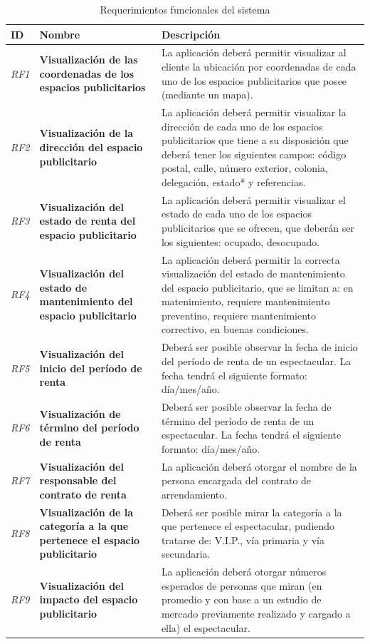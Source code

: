 \documentclass[12pt]{article}
\begin{document}
{\small
\begin{longtable}[H]{m{2cm}m{4cm}m{6cm}}
    \caption{\normalsize{Requerimientos funcionales del sistema}}\\
    
    \toprule
    
    \centering \textbf{ID} & \centering  \textbf{Nombre} & \centering \small \textbf{Descripción} \tabularnewline
    \midrule
    \textit{RF1} & \textbf{Visualización de las coordenadas de los espacios publicitarios} & La aplicación deberá permitir visualizar al cliente la ubicación por coordenadas de cada uno de los espacios publicitarios que posee (mediante un mapa). \tabularnewline
    \textit{RF2} & \textbf{Visualización de la dirección del espacio publicitario} & La aplicación deberá permitir visualizar la dirección de cada uno de los espacios publicitarios que tiene a su disposición que deberá tener los siguientes campos: código postal, calle, número exterior, colonia, delegación, estado* y referencias. \tabularnewline
    \textit{RF3} & \textbf{Visualización del estado de renta del espacio publicitario} & La aplicación deberá permitir visualizar  el estado de cada uno de los espacios publicitarios que se ofrecen, que deberán ser los siguientes: ocupado, desocupado. \tabularnewline
    \textit{RF4} & \textbf{Visualización  del estado de mantenimiento del espacio publicitario} & La aplicación deberá permitir la correcta visualización del estado de mantenimiento del espacio publicitario, que se limitan a: en matenimiento, requiere mantenimiento preventino, requiere mantenimiento correctivo, en buenas condiciones. \tabularnewline
    \textit{RF5} & \textbf{Visualización del inicio del período de renta} & Deberá ser posible observar la fecha de inicio del período de renta de un espectacular. La fecha tendrá el siguiente formato: día/mes/año. \tabularnewline
    \textit{RF6} & \textbf{Visualización de término del período de renta} & Deberá ser posible observar la fecha de término del período de renta de un espectacular. La fecha tendrá el siguiente formato: día/mes/año.
    \tabularnewline
    \textit{RF7} & \textbf{Visualización del responsable del contrato de renta} & La aplicación deberá otorgar el nombre de la persona encargada del contrato de arrendamiento. \tabularnewline
    \textit{RF8} & \textbf{Visualización de la categoría a la que pertenece el espacio publicitario} & Deberá ser posible mirar la categoría a la que pertenece el espectacular, pudiendo tratarse de: V.I.P., vía primaria y vía secundaria. \tabularnewline
    \textit{RF9} & \textbf{Visualización del impacto del espacio publicitario} & La aplicación deberá otorgar números esperados de personas que miran (en promedio y con base a un estudio de mercado previamente realizado y cargado a ella) el espectacular. \tabularnewline

\end{longtable}}
\end{document}
